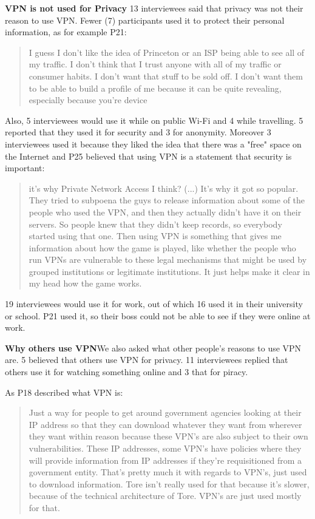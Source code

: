 \textbf{VPN is not used for Privacy} 13 interviewees said that privacy was not their reason to use VPN. Fewer (7) participants used it to protect their personal information, as for example P21:
\begin{quote}I guess I don't like the idea of Princeton or an ISP being able to see all of my traffic. I don't think that I trust anyone with all of my traffic or consumer habits. I don't want that stuff to be sold off. I don't want them to be able to build a profile of me because it can be quite revealing, especially because you're device\end{quote}


Also, 5 interviewees would use it while on public Wi-Fi and 4 while travelling. 5 reported that they used it for security and 3 for anonymity.  Moreover 3 interviewees used it because they liked the idea that there was a "free" space on the Internet and P25 believed that using VPN is a statement that security is important:

\begin{quote}it's why Private Network Access I think? (...) It's why it got so popular. They tried to subpoena the guys to release information about some of the people who used the VPN, and then they actually didn't have it on their servers. So people knew that they didn't keep records, so everybody started using that one. Then using VPN is something that gives me information about how the game is played, like whether the people who run VPNs are vulnerable to these legal mechanisms that might be used by grouped institutions or legitimate institutions. It just helps make it clear in my head how the game works.\end{quote}


19 interviewees would use it for work, out of which 16 used it in their university or school. P21 used it, so their boss could not be able to see if they were online at work.


\textbf{Why others use VPN}We also asked what other people's reasons to use VPN are. 5 believed that others use VPN for privacy. 11 interviewees replied that others use it for watching something online and 3 that for piracy.

As P18 described what VPN is:
\begin{quote}
Just a way for people to get around government agencies looking at their IP address so that they can download whatever they want from wherever they want within reason because these VPN's are also subject to their own vulnerabilities. These IP addresses, some VPN's have policies where they will provide information from IP addresses if they're requisitioned from a government entity. That's pretty much it with regards to VPN's, just used to download information. Tore isn't really used for that because it's slower, because of the technical architecture of Tore. VPN's are just used mostly for that.\end{quote}

